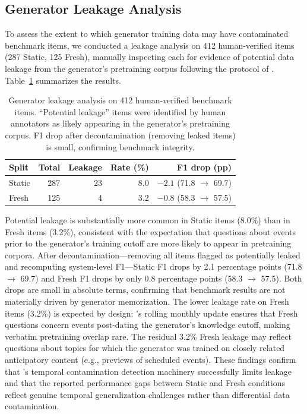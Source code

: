 \subsection{Generator Leakage Analysis}
\label{sec:leakage}

To assess the extent to which generator training data may have contaminated benchmark items, we conducted a leakage analysis on 412 human-verified items (287 Static, 125 Fresh), manually inspecting each for evidence of potential data leakage from the generator's pretraining corpus following the protocol of \citet{golchin2024time}. Table~\ref{tab:leakage} summarizes the results.

\begin{table}[t]
\centering
\footnotesize
\setlength{\tabcolsep}{3.5pt}
\caption{Generator leakage analysis on 412 human-verified benchmark items. ``Potential leakage'' items were identified by human annotators as likely appearing in the generator's pretraining corpus. F1 drop after decontamination (removing leaked items) is small, confirming benchmark integrity.}
\label{tab:leakage}
\begin{tabular}{lrrrr}
\toprule
Split & Total & Leakage & Rate (\%) & F1 drop (pp) \\
\midrule
Static & 287 & 23 & 8.0 & $-2.1$ (71.8 $\to$ 69.7) \\
Fresh  & 125 & 4  & 3.2 & $-0.8$ (58.3 $\to$ 57.5) \\
\bottomrule
\end{tabular}
\end{table}

Potential leakage is substantially more common in Static items (8.0\%) than in Fresh items (3.2\%), consistent with the expectation that questions about events prior to the generator's training cutoff are more likely to appear in pretraining corpora. After decontamination---removing all items flagged as potentially leaked and recomputing system-level F1---Static F1 drops by 2.1 percentage points (71.8 $\to$ 69.7) and Fresh F1 drops by only 0.8 percentage points (58.3 $\to$ 57.5). Both drops are small in absolute terms, confirming that benchmark results are not materially driven by generator memorization. The lower leakage rate on Fresh items (3.2\%) is expected by design: \method{}'s rolling monthly update ensures that Fresh questions concern events post-dating the generator's knowledge cutoff, making verbatim pretraining overlap rare. The residual 3.2\% Fresh leakage may reflect questions about topics for which the generator was trained on closely related anticipatory content (e.g., previews of scheduled events). These findings confirm that \method{}'s temporal contamination detection machinery successfully limits leakage and that the reported performance gaps between Static and Fresh conditions reflect genuine temporal generalization challenges rather than differential data contamination.
